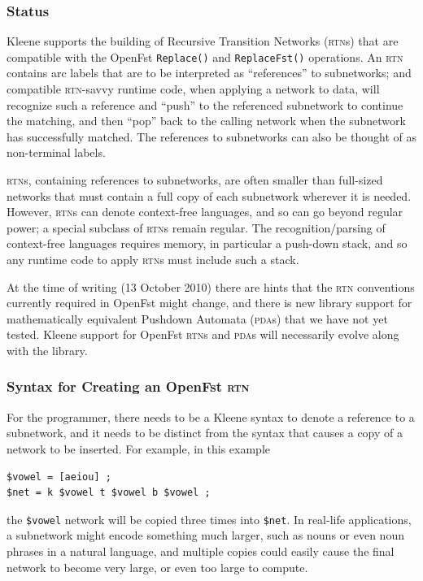 \documentclass[letterpaper,12pt]{article}
\newcommand{\acro}{\textsc}
\begin{document}
\subsubsection{Status}

Kleene supports the building of Recursive Transition Networks
(\acro{rtn}s) that are compatible with the OpenFst \texttt{Replace()} and
\texttt{ReplaceFst()} operations.  An \acro{rtn} contains arc labels that
are to be interpreted as ``references'' to subnetworks; and compatible
\acro{rtn}-savvy runtime code, when applying a network to data, will
recognize such a reference and ``push'' to the referenced subnetwork to
continue the matching, and then ``pop'' back to the calling network when
the subnetwork has successfully matched.  The references to subnetworks
can also be thought of as non-terminal labels.

\acro{rtn}s, containing references to subnetworks, are often smaller than
full-sized networks that must contain a full copy of each subnetwork
wherever it is needed.  However, \acro{rtn}s can denote context-free
languages, and so can go beyond regular power; a special subclass of
\acro{rtn}s remain regular.  The recognition/parsing of context-free
languages requires memory, in particular a push-down stack, and so any
runtime code to apply \acro{rtn}s must include such a stack.

At the time of writing (13 October 2010) there are hints that the
\acro{rtn} conventions currently required in OpenFst might change, and
there is new library support for mathematically equivalent Pushdown
Automata (\acro{pda}s) that we have not yet tested.  Kleene support for
OpenFst \acro{rtn}s and \acro{pda}s will necessarily evolve along with
the library.

\subsubsection{Syntax for Creating an OpenFst \acro{rtn}}

For the programmer, there needs to be a Kleene syntax to denote a
reference to a subnetwork, and it needs to be distinct from the syntax
that causes a copy of a network to be inserted.  For example, in this
example

\begin{Verbatim}[fontsize=\small]
$vowel = [aeiou] ;
$net = k $vowel t $vowel b $vowel ;
\end{Verbatim}

\noindent
the \verb!$vowel! network will be copied three times into \verb!$net!.
In real-life applications, a subnetwork might encode something much
larger, such as nouns or even noun phrases in a natural language, and
multiple copies could easily cause the final network to become very
large, or even too large to compute.
\end{document}
